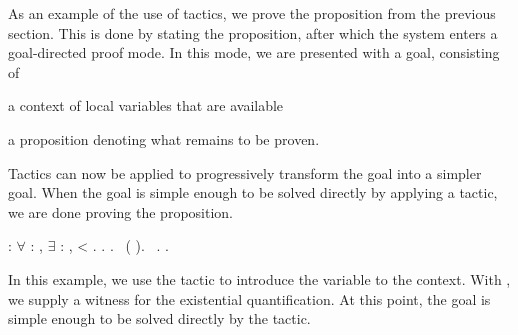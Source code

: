 As an example of the use of tactics, we prove the proposition from the
previous section. This is done by stating the proposition, after which
the system enters a goal-directed proof mode. In this mode, we are
presented with a goal, consisting of
\begin{inparaenum}[(i)]
\item a context of local variables that are available
\item a proposition denoting what remains to be proven.
\end{inparaenum}
Tactics can now be applied to progressively transform the goal into a
simpler goal. When the goal is simple enough to be solved directly by
applying a tactic, we are done proving the proposition.
\begin{singlespace}
\begin{coqdoccode}
\coqdocnoindent
{}
 :
\ensuremath{\forall}  :
,
\ensuremath{\exists}  :
,
 < .\coqdoceol
\coqdocnoindent
{}.\coqdoceol
\coqdocindent{1.0em}
 . $\,$
(
). $\,$
.\coqdoceol
\coqdocnoindent
{}.\coqdoceol
\end{coqdoccode}
\end{singlespace}
In this example, we use the tactic  to introduce the
variable  to the context. With ,
we supply a witness for the existential quantification. At this point,
the goal is simple enough to be solved directly by the
 tactic.

